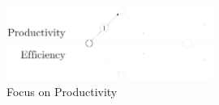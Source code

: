 \begin{figure}[!h]
\begin{center}
\includegraphics[width=0.6\textwidth]{../resources/state-of-the-art-1.pdf}
\end{center}
\caption{Focus on Productivity}
\label{fig:state-of-the-art-1}
\end{figure}







